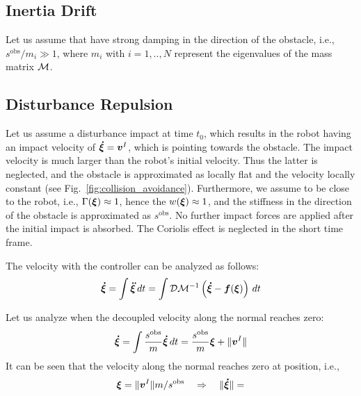 \documentclass[conference]{IEEEtran}
\begin{document}
\subsection{Inertia Drift}
Let us assume that have strong damping in the direction of the obstacle, i.e., $s^{\mathrm{obs}} / m_i \gg 1$, where $m_i$ with $i = 1, .., N$ represent the eigenvalues of the mass matrix $\mathcal{M}$. 


\subsection{Disturbance Repulsion}
Let us assume a disturbance impact at time $t_0$, which results in the robot having an impact velocity of $\boldsymbol{\dot \xi} = \boldsymbol{v}^I$, which is pointing towards the obstacle. The impact velocity is much larger than the robot's initial velocity. Thus the latter is neglected, and the obstacle is approximated as locally flat and the velocity locally constant (see Fig.~\ref{fig:collision_avoidance}). Furthermore, we assume to be close to the robot, i.e., $\Gamma(\boldsymbol{\xi}) \approx 1$, hence the $w(\boldsymbol{\xi}) \approx 1$, and the stiffness in the direction of the obstacle is approximated as $s^{\mathrm{obs}}$.
No further impact forces are applied after the initial impact is absorbed. The Coriolis effect is neglected in the short time frame.

The velocity with the controller can be analyzed as follows:
\begin{equation}
    \boldsymbol{\dot \xi} = \int \boldsymbol{\ddot \xi} \, dt = \int \mathcal{D} \mathcal{M}^{-1} \left( \boldsymbol{\dot \xi} - \boldsymbol{f}(\boldsymbol{\xi}) \right) \, dt
\end{equation}

Let us analyze when the decoupled velocity along the normal reaches zero:
\begin{equation}
    \vecs{\dot \xi} = \int \frac{s^{\mathrm{obs}}}{m} \vecs{\dot \xi} \, dt = \frac{s^{\mathrm{obs}}}{m} \vecs{\xi} + \| \vecs v^I \| \label{eq:velocity_with_control}
\end{equation}
It can be seen that the velocity along the normal reaches zero at position, i.e., 
\begin{equation}
    \boldsymbol{\xi} = \| \boldsymbol{v}^I \| {m} / {s^{\mathrm{obs}}} 
    \quad \Rightarrow \quad
    \| \boldsymbol{\dot \xi} \| =
\end{equation}

\begin{lemma}

\end{lemma}
\end{document}
